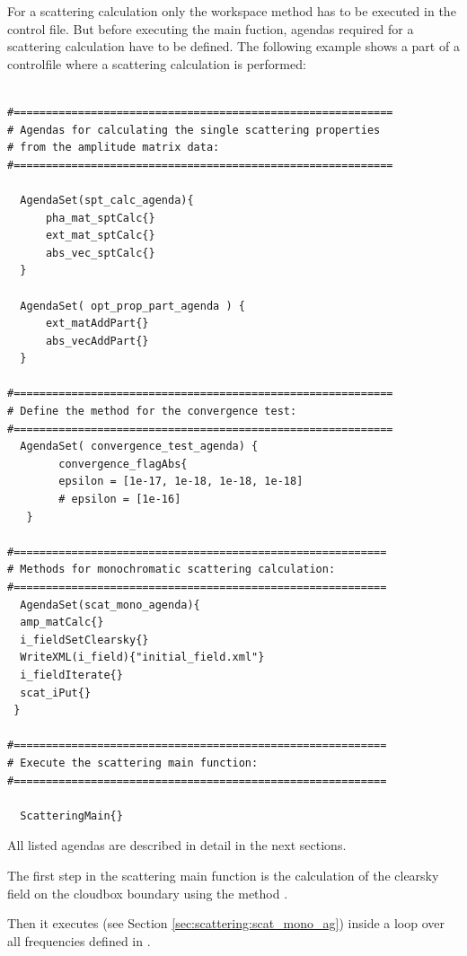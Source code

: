 \label{sec:scattering:main_function}
For a scattering calculation only the workspace method
 has to be executed in the control file.  But
before executing the main fuction, agendas required for a scattering
calculation have to be defined.  The following example shows a part of
a controlfile where a scattering calculation is performed:
\begin{verbatim}

#===========================================================
# Agendas for calculating the single scattering properties
# from the amplitude matrix data:
#===========================================================

  AgendaSet(spt_calc_agenda){
      pha_mat_sptCalc{}
      ext_mat_sptCalc{}
      abs_vec_sptCalc{}
  }

  AgendaSet( opt_prop_part_agenda ) {
      ext_matAddPart{}
      abs_vecAddPart{}
  }
 
#===========================================================
# Define the method for the convergence test:
#===========================================================
  AgendaSet( convergence_test_agenda) {
        convergence_flagAbs{
        epsilon = [1e-17, 1e-18, 1e-18, 1e-18] 
        # epsilon = [1e-16]
   }
  
#==========================================================
# Methods for monochromatic scattering calculation:
#==========================================================
  AgendaSet(scat_mono_agenda){
  amp_matCalc{}
  i_fieldSetClearsky{}
  WriteXML(i_field){"initial_field.xml"}        
  i_fieldIterate{}
  scat_iPut{}
 }
                
#==========================================================
# Execute the scattering main function:
#==========================================================       
        
  ScatteringMain{}

\end{verbatim}


All listed agendas are described in detail in the next sections.\\
\vspace*{1ex}

The first step in the scattering main function is the calculation of
the clearsky field on the cloudbox boundary using the method
.

Then it executes (see Section
\ref{sec:scattering:scat_mono_ag}) inside a loop over all frequencies
defined in .

